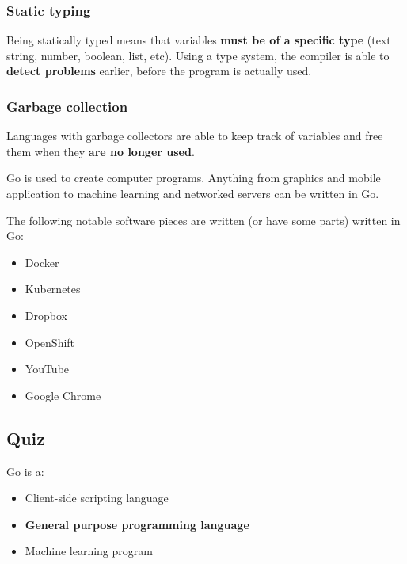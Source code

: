 \documentclass[]{book}
\providecommand{\tightlist}{%
  \setlength{\itemsep}{0pt}\setlength{\parskip}{0pt}}
\begin{document}
\hypertarget{static-typing}{%
\subsubsection*{Static typing}\label{static-typing}}

Being statically typed means that variables \textbf{must be of a specific type}
(text string, number, boolean, list, etc). Using a type system, the compiler is
able to \textbf{detect problems} earlier, before the program is actually used.

\hypertarget{garbage-collection}{%
\subsubsection*{Garbage collection}\label{garbage-collection}}

Languages with garbage collectors are able to keep track of variables and free
them when they \textbf{are no longer used}.

Go is used to create computer programs. Anything from graphics and mobile
application to machine learning and networked servers can be written in Go.

The following notable software pieces are written (or have some parts) written
in Go:

\begin{itemize}
\tightlist
\item
  Docker
\item
  Kubernetes
\item
  Dropbox
\item
  OpenShift
\item
  YouTube
\item
  Google Chrome
\end{itemize}

\hypertarget{quiz}{%
\subsection{Quiz}\label{quiz}}

Go is a:

\begin{itemize}
\tightlist
\item
  Client-side scripting language
\item
  \textbf{General purpose programming language}
\item
  Machine learning program
\end{itemize}
\end{document}
